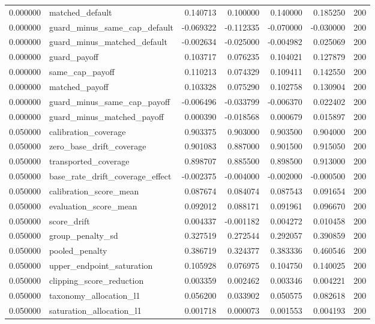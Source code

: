 \begin{tabular}{rlrrrrr}
0.000000 & matched\_default & 0.140713 & 0.100000 & 0.140000 & 0.185250 & 200 \\
0.000000 & guard\_minus\_same\_cap\_default & -0.069322 & -0.112335 & -0.070000 & -0.030000 & 200 \\
0.000000 & guard\_minus\_matched\_default & -0.002634 & -0.025000 & -0.004982 & 0.025069 & 200 \\
0.000000 & guard\_payoff & 0.103717 & 0.076235 & 0.104021 & 0.127879 & 200 \\
0.000000 & same\_cap\_payoff & 0.110213 & 0.074329 & 0.109411 & 0.142550 & 200 \\
0.000000 & matched\_payoff & 0.103328 & 0.075290 & 0.102758 & 0.130904 & 200 \\
0.000000 & guard\_minus\_same\_cap\_payoff & -0.006496 & -0.033799 & -0.006370 & 0.022402 & 200 \\
0.000000 & guard\_minus\_matched\_payoff & 0.000390 & -0.018568 & 0.000679 & 0.015897 & 200 \\
0.050000 & calibration\_coverage & 0.903375 & 0.903000 & 0.903500 & 0.904000 & 200 \\
0.050000 & zero\_base\_drift\_coverage & 0.901083 & 0.887000 & 0.901500 & 0.915050 & 200 \\
0.050000 & transported\_coverage & 0.898707 & 0.885500 & 0.898500 & 0.913000 & 200 \\
0.050000 & base\_rate\_drift\_coverage\_effect & -0.002375 & -0.004000 & -0.002000 & -0.000500 & 200 \\
0.050000 & calibration\_score\_mean & 0.087674 & 0.084074 & 0.087543 & 0.091654 & 200 \\
0.050000 & evaluation\_score\_mean & 0.092012 & 0.088171 & 0.091961 & 0.096670 & 200 \\
0.050000 & score\_drift & 0.004337 & -0.001182 & 0.004272 & 0.010458 & 200 \\
0.050000 & group\_penalty\_sd & 0.327519 & 0.272544 & 0.292057 & 0.390859 & 200 \\
0.050000 & pooled\_penalty & 0.386719 & 0.324377 & 0.383336 & 0.460546 & 200 \\
0.050000 & upper\_endpoint\_saturation & 0.105928 & 0.076975 & 0.104750 & 0.140025 & 200 \\
0.050000 & clipping\_score\_reduction & 0.003359 & 0.002462 & 0.003346 & 0.004221 & 200 \\
0.050000 & taxonomy\_allocation\_l1 & 0.056200 & 0.033902 & 0.050575 & 0.082618 & 200 \\
0.050000 & saturation\_allocation\_l1 & 0.001718 & 0.000073 & 0.001553 & 0.004193 & 200 \\

\end{tabular}
